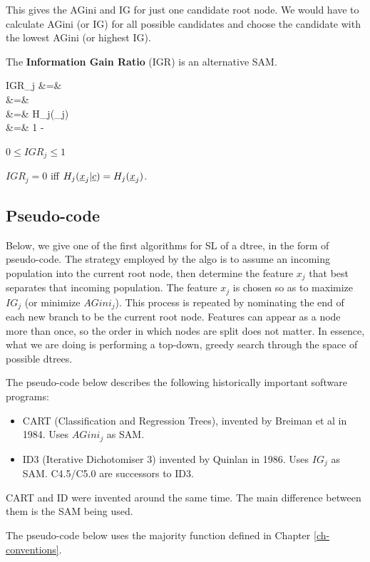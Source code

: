 This gives
the AGini and IG for just one 
candidate root node.
We would have
to calculate
AGini (or IG) for all
possible candidates
and choose the candidate
with the lowest AGini (or highest IG).

The {\bf Information Gain Ratio} (IGR) is an alternative SAM.

\beqa
IGR_j
&=&
\\
&=&
\\
&=&
{H_j(\rvx_j)}
\\
&=&
1 -\;
\eeqa

$0\leq IGR_j\leq 1$

$IGR_j=0$ iff $H_j(\rvx_j |\rvc)=H_j(\rvx_j)$.




\subsection{Pseudo-code}

Below,
we give one of the first
algorithms for SL
of a dtree, in the form
of pseudo-code.
The strategy
employed by
the algo
is to assume an incoming
population into the current root node,
then
determine the feature $x_j$
 that best separates that 
incoming
population. The feature
$x_j$ is chosen so as to maximize
$IG_j$
(or minimize $AGini_j$). This
process is repeated by nominating
the end of each new branch to be
the current root node.
Features can appear as a node 
more than once, so the order in 
which nodes are split does not matter.
In essence, what we are doing is
performing a top-down, greedy search
through the space of possible dtrees.

The pseudo-code below describes the following 
historically important
software programs:
\begin{itemize}
\item CART (Classification and Regression Trees),
invented by Breiman et al in 1984. Uses $AGini_j$ as SAM.
\item
ID3 (Iterative Dichotomiser 3)
invented by Quinlan in 1986. Uses $IG_j$ as SAM.
C4.5/C5.0 are successors to ID3.
\end{itemize}

CART and ID were 
invented around the same time.
The main difference between them is the SAM
being used.


The pseudo-code below
uses the majority function
defined in Chapter \ref{ch-conventions}.


